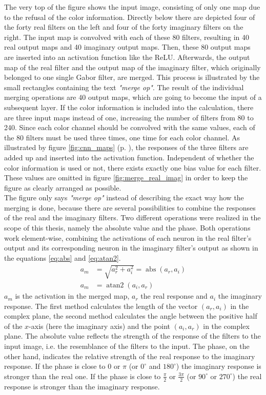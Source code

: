 \documentclass[11pt, a4paper]{article}
\newcommand\q[1]{\emph{"#1"}}
\newcommand\myref[1]{\ref{#1} (p. \pageref{#1})}
\begin{document}


The very top of the figure shows the input image, consisting of only one map due to the refusal of the color information. Directly below there are depicted four of the forty real filters on the left and four of the forty imaginary filters on the right. The input map is convolved with each of these 80 filters, resulting in 40 real output maps and 40 imaginary output maps. Then, these 80 output maps are inserted into an activation function like the \ac{ReLU}. Afterwards, the output map of the real filter and the output map of the imaginary filter, which originally belonged to one single Gabor filter, are merged. This process is illustrated by the small rectangles containing the text \q{merge op}. The result of the individual merging operations are 40 output maps, which are going to become the input of a subsequent layer. If the color information is included into the calculation, there are three input maps instead of one, increasing the number of filters from 80 to 240. Since each color channel should be convolved with the same values, each of the 80 filters must be used three times, one time for each color channel. As illustrated by figure \myref{fig:cnn_maps}, the responses of the three filters are added up and inserted into the activation function. Independent of whether the color information is used or not, there exists exactly one bias value for each filter. These values are omitted in figure \ref{fig:merge_real_imag} in order to keep the figure as clearly arranged as possible.\\
The figure only says \q{merge op} instead of describing the exact way how the merging is done, because there are several possibilities to combine the responses of the real and the imaginary filters. Two different operations were realized in the scope of this thesis, namely the absolute value and the phase. Both operations work element-wise, combining the activations of each neuron in the real filter's output and its corresponding neuron in the imaginary filter's output as shown in the equations \eqref{eq:abs} and \eqref{eq:atan2}.
\begin{align}
\label{eq:abs}
a_m &= \sqrt{a_r^2 + a_i^2} = \operatorname{abs}(a_r, a_i)\\
\label{eq:atan2}
a_m &= \operatorname{atan2}(a_i, a_r)
\end{align}
$a_m$ is the activation in the merged map, $a_r$ the real response and $a_i$ the imaginary response. The first method calculates the length of the vector $(a_r,a_i)$ in the complex plane, the second method calculates the angle between the positive half of the $x$-axis (here the imaginary axis) and the point $(a_i,a_r)$ in the complex plane. The absolute value reflects the strength of the response of the filters to the input image, i.e. the resemblance of the filters to the input. The phase, on the other hand, indicates the relative strength of the real response to the imaginary response. If the phase is close to $0$ or $\pi$ (or $0^\circ$ and $180^\circ$) the imaginary response is stronger than the real one. If the phase is close to $\frac{\pi}{2}$ or $\frac{3\pi}{2}$ (or $90^\circ$ or $270^\circ$) the real response is stronger than the imaginary response.\\
\end{document}
